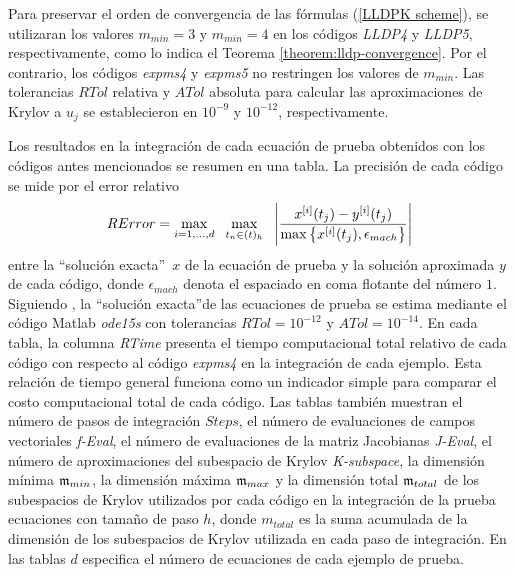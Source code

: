 Para preservar el orden de convergencia de las fórmulas (\ref{LLDPK scheme}), se utilizaran los valores $m_{min}=3$ y $m_{min}=4$ en los códigos \emph{LLDP4} y \emph{LLDP5}, respectivamente, como lo indica el Teorema \ref{theorem:lldp-convergence}. Por el contrario, los códigos \emph{expms4} y \emph{expms5} no restringen los valores de $m_{min}$. Las tolerancias $RTol$ relativa y $ATol$ absoluta para calcular las aproximaciones de Krylov a $u_j$ se establecieron en $10^{-9}$ y $10^{-12}$, respectivamente.

Los resultados en la integración de cada ecuación de prueba obtenidos con los códigos antes mencionados se resumen en una tabla. La precisión de cada código se mide por el error relativo
\begin{equation}\label{num-exp-lldp-fix-step:ER}
	RError = \max_{i=1,\ldots,d} \;\ \max_{t_n\in(t)_h}  \;\ \left\lvert\frac{x^{[i]}(t_j)-y^{[i]}(t_j)}{\maxx{x^{[i]}(t_j),\epsilon_{mach}}}\right\rvert
\end{equation}
entre la \textquotedblleft solución exacta\textquotedblright~$x$ de la ecuación de prueba y la solución aproximada $y$ de cada código, donde $\epsilon_{mach}$ denota el espaciado en coma flotante del número $1$. Siguiendo \cite{tokman2006efficient}, la \textquotedblleft solución exacta\textquotedblright de las ecuaciones de prueba se estima mediante el código Matlab \textit{ode15s} con tolerancias $RTol=10^{-12}$ y $ATol=10^{-14}$. En cada tabla, la columna \textit{RTime} presenta el tiempo computacional total relativo de cada código con respecto al código \emph{expms4} en la integración de cada ejemplo. Esta relación de tiempo general funciona como un indicador simple para comparar el costo computacional total de cada código. Las tablas también muestran el número de pasos de integración $Steps$, el número de evaluaciones de campos vectoriales \textit{f-Eval}, el número de evaluaciones de la matriz Jacobianas \textit{J-Eval}, el número de aproximaciones del subespacio de Krylov \textit{K-subspace}, la dimensión mínima $\mathfrak{m}_{min}$, la dimensión máxima $\mathfrak{m}_{max}$ y la dimensión total $\mathfrak{m}_{total}$ de los subespacios de Krylov utilizados por cada código en la integración de la prueba ecuaciones con tamaño de paso $h$, donde $m_{total}$ es la suma acumulada de la dimensión de los subespacios de Krylov utilizada en cada paso de integración. En las tablas $d$ especifica el número de ecuaciones de cada ejemplo de prueba.

